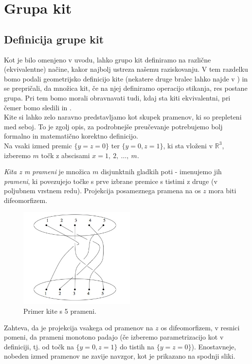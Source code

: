 \documentclass[mat1]{fmfdelo}
\newcommand{\R}{\mathbb R}
\begin{document}
\section{Grupa kit}

\subsection{Definicija grupe kit}

Kot je bilo omenjeno v uvodu, lahko grupo kit definiramo na različne (ekvivalentne) načine, kakor najbolj ustreza našemu raziskovanju. V tem razdelku bomo podali geometrijsko definicijo kite (nekatere druge bralec lahko najde v \cite{Manturov}) in se prepričali, da množica kit, če na njej definiramo operacijo stikanja, res postane grupa. Pri tem bomo morali obravnavati tudi, kdaj sta kiti ekvivalentni, pri čemer bomo sledili \cite{Burde} in \cite{Manturov}.\\
Kite si lahko zelo naravno predstavljamo kot skupek pramenov, ki so prepleteni med seboj. To je zgolj opis, za podrobnejše preučevanje potrebujemo bolj formalno in matematično korektno definicijo.\\
Na vsaki izmed premic $\{y = z = 0\}$ ter $\{y = 0, z = 1\}$, ki sta vloženi v $\R^3$, izberemo $m$ točk z abscisami $x=1,\ 2,\ \ldots,\ m$.

\begin{definicija}
\emph{Kita z m prameni} je množica $m$ disjunktnih gladkih poti - imenujemo jih \emph{prameni}, ki povezujejo točke s prve izbrane premice s tistimi z druge (v poljubnem vrstnem redu). Projekcija posameznega pramena na os $z$ mora biti difeomorfizem.
\end{definicija}

\begin{figure}[ht!]
\includegraphics[height = 5cm]{Primer_kite_1}
\caption{Primer kite s 5 prameni.}
\end{figure}

\begin{opomba}
Zahteva, da je projekcija vsakega od pramenov na $z$ os difeomorfizem, v resnici pomeni, da prameni monotono padajo (če izberemo parametrizacijo kot v definiciji, tj. od točk na $\{y = 0, z = 1\}$ do tistih na $\{y = z = 0\}$). Enostavneje, nobeden izmed pramenov ne zavije navzgor, kot je prikazano na spodnji sliki.
\end{opomba}
\end{document}
